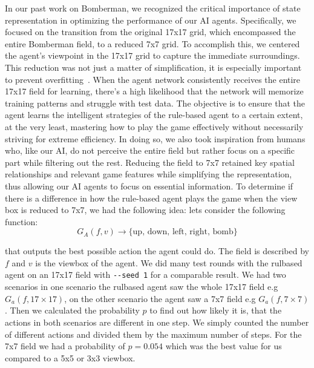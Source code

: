 In our past work on Bomberman, we recognized the critical importance of state representation in optimizing the performance 
of our AI agents. Specifically, we focused on the transition from the original 17x17 grid, which encompassed the entire Bomberman field, 
to a reduced 7x7 grid. To accomplish this, we centered the agent's viewpoint in the 17x17 grid to capture the immediate surroundings. 
This reduction was not just a matter of simplification, it is especially important to prevent overfitting~\cite{Art:Overfitting}. When the agent network consistently 
receives the entire 17x17 field for learning, there's a high likelihood that the network will memorize training patterns and struggle with test data. 
The objective is to ensure that the agent learns the intelligent strategies of the rule-based agent to a certain extent, at the very least, mastering how 
to play the game effectively without necessarily striving for extreme efficiency. In doing so, we also took inspiration from humans who, like our AI, do not perceive 
the entire field but rather focus on a specific part while filtering out the rest.
Reducing the field to 7x7 retained key spatial relationships 
and relevant game features while simplifying the representation, thus allowing our AI agents to focus on essential information.
To determine if there is a difference in how the rule-based agent plays the game when the view box is reduced to 7x7, we had the following idea:
lets consider the following function: 
\begin{equation} \label{eq:1}
G_A(f,v) \rightarrow \{\text{up, down, left, right, bomb}\}
\end{equation}

that outputs the best possible action the agent could do. The field is described by $f$ and $v$ is the viewbox of the agent. We did many 
test rounds with the rulbased agent on an 17x17 field with \verb|--seed 1| for a comparable result. We had two scenarios
in one scenario the rulbased agent saw the whole 17x17 field e.g $G_a(f, 17\times17)$, on the other scenario the agent saw a
7x7 field e.g $G_a(f, 7\times7)$. Then we calculated the probability $p$ to find out how likely it is, that the actions in both scenarios are different in one step.
We simply counted the number of different actions and divided them by the maximum number of steps.
For the 7x7 field we had a probability of $p=0.054$ which was the best value for us compared to a 5x5 or 3x3 viewbox.\\


